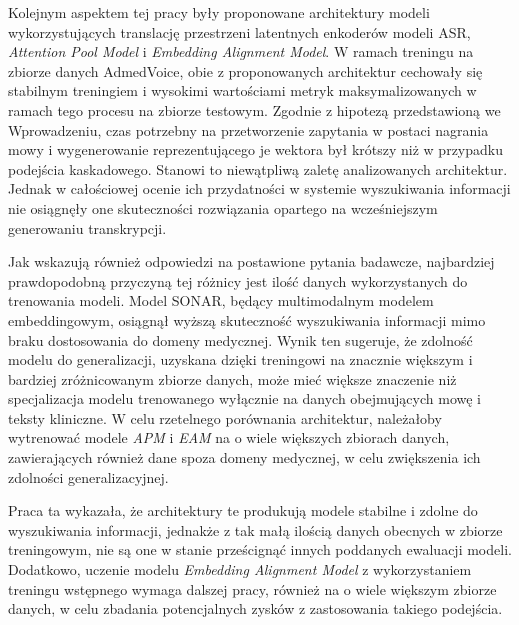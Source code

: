 Kolejnym aspektem tej pracy były proponowane architektury modeli wykorzystujących translację przestrzeni latentnych enkoderów modeli ASR, \textit{Attention Pool Model} i \textit{Embedding Alignment Model}. W ramach treningu na zbiorze danych AdmedVoice, obie z proponowanych architektur cechowały się stabilnym treningiem i wysokimi wartościami metryk maksymalizowanych w ramach tego procesu na zbiorze testowym. Zgodnie z hipotezą przedstawioną we Wprowadzeniu, czas potrzebny na przetworzenie zapytania w postaci nagrania mowy i wygenerowanie reprezentującego je wektora był krótszy niż w przypadku podejścia kaskadowego. Stanowi to niewątpliwą zaletę analizowanych architektur. Jednak w całościowej ocenie ich przydatności w systemie wyszukiwania informacji nie osiągnęły one skuteczności rozwiązania opartego na wcześniejszym generowaniu transkrypcji.

Jak wskazują również odpowiedzi na postawione pytania badawcze, najbardziej prawdopodobną przyczyną tej różnicy jest ilość danych wykorzystanych do trenowania modeli. Model SONAR, będący multimodalnym modelem embeddingowym, osiągnął wyższą skuteczność wyszukiwania informacji mimo braku dostosowania do domeny medycznej. Wynik ten sugeruje, że zdolność modelu do generalizacji, uzyskana dzięki treningowi na znacznie większym i bardziej zróżnicowanym zbiorze danych, może mieć większe znaczenie niż specjalizacja modelu trenowanego wyłącznie na danych obejmujących mowę i teksty kliniczne. W celu rzetelnego porównania architektur, należałoby wytrenować modele \textit{APM} i \textit{EAM} na o wiele większych zbiorach danych, zawierających również dane spoza domeny medycznej, w celu zwiększenia ich zdolności generalizacyjnej.

Praca ta wykazała, że architektury te produkują modele stabilne i zdolne do wyszukiwania informacji, jednakże z tak małą ilością danych obecnych w zbiorze treningowym, nie są one w stanie prześcignąć innych poddanych ewaluacji modeli. Dodatkowo, uczenie modelu \textit{Embedding Alignment Model} z wykorzystaniem treningu wstępnego wymaga dalszej pracy, również na o wiele większym zbiorze danych, w celu zbadania potencjalnych zysków z zastosowania takiego podejścia.
